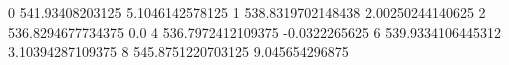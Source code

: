 0 541.93408203125 5.1046142578125
1 538.8319702148438 2.00250244140625
2 536.8294677734375 0.0
4 536.7972412109375 -0.0322265625
6 539.9334106445312 3.10394287109375
8 545.8751220703125 9.045654296875
